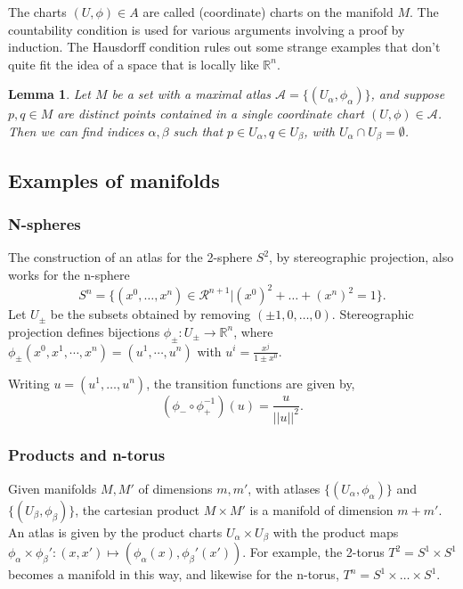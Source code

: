 \documentclass{article}
\newtheorem{lemma}[theorem]{Lemma}
\theoremstyle{definition}
\begin{document}
The charts $(U,\phi) \in A$ are called (coordinate) charts on the manifold $M$. The countability condition is used for various arguments involving a proof by induction. The Hausdorff condition rules out some strange examples that don’t quite fit the idea of a space that is locally like $\mathbb R^n$.

\begin{lemma}

Let $M$ be a set with a maximal atlas $\mathscr{A} =  \{(U_\alpha, \phi_\alpha) \}$, and suppose $p,q \in M$ are distinct points contained in a single coordinate chart $(U,\phi) \in \mathscr{A}$. Then we can find indices $\alpha,\beta$ such that $p \in U_\alpha, q \in U_\beta$, with $U_\alpha \cap U_\beta = \emptyset$.
\end{lemma}

\subsection{Examples of manifolds}
\subsubsection{N-spheres}
The construction of an atlas for the 2-sphere $S^2$, by stereographic projection, also works for the n-sphere
\[
    S^n = \{ (x^0, \dots, x^n) \in \mathcal R^{n+1} | (x^0)^2 + \dots + (x^n)^2  = 1\}.
\]
Let $U_{\pm}$ be the subsets obtained by removing $(\pm 1, 0,\dots, 0)$. Stereographic projection defines bijections $\phi_{\pm} : U_{\pm} \rightarrow \mathbb R^{n}$,  where $\phi_{\pm} (x^0, x^1, \cdots, x^n) = (u^1, \cdots, u^n)$ with $\displaystyle u^{i} = \frac{x^j}{1\pm x^0}.$

Writing $u = (u^1,\dots,u^n)$, the transition functions are given by,
\[
    (\phi_- \circ \phi_+^{-1})(u) = \frac{u}{||u||^2}.
\]

\subsubsection{Products and n-torus}

Given manifolds $M,M'$ of dimensions $m,m'$, with atlases $\{(U_\alpha,\phi_\alpha) \}$ and $\{(U_\beta,\phi_\beta)\}$, the cartesian product $M \times M'$ is a manifold of dimension $m + m'$. An atlas is given by the product charts $U_\alpha \times U_\beta$ with the product maps $\phi_\alpha \times \phi_\beta' : (x, x') \mapsto (\phi_\alpha(x), \phi_\beta'(x'))$. For example, the 2-torus $T^2 = S^1 \times S^1$ becomes a manifold in this way, and likewise for the n-torus, $T^n = S^1 \times \dots \times S^1$.
\end{document}
